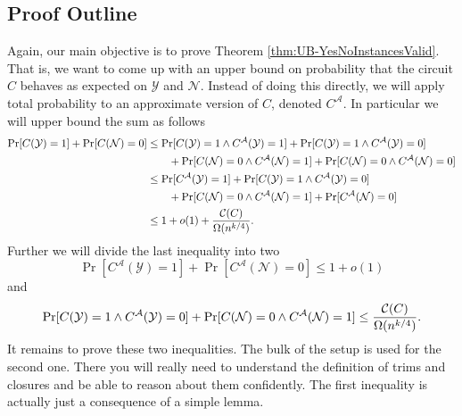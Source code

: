 \documentclass[11pt]{article}
\begin{document}
	\subsection{Proof Outline}
	Again, our main objective is to prove Theorem \ref{thm:UB-YesNoInstancesValid}. That is, we want to come up with an upper bound on probability that the circuit $C$ behaves as expected on $\mathcal{Y}$ and $\mathcal{N}$. Instead of doing this directly, we will apply total probability to an approximate version of $C$, denoted $C^{\mathcal{A}}$. In particular we will upper bound the sum as follows
	\begin{align*}
		\Pr[C(\mathcal{Y}) = 1] + \Pr[C(\mathcal{N}) = 0] &\leq \Pr[C(\mathcal{Y}) = 1 \land C^{\mathcal{A}}(\mathcal{Y}) = 1] + \Pr[C(\mathcal{Y}) = 1 \land C^{\mathcal{A}}(\mathcal{Y}) = 0] \\
		&\qquad + \Pr[C(\mathcal{N}) = 0 \land C^{\mathcal{A}}(\mathcal{N}) = 1] + \Pr[C(\mathcal{N}) = 0 \land C^{\mathcal{A}}(\mathcal{N}) = 0]\\
		&\leq \Pr[C^{\mathcal{A}}(\mathcal{Y}) = 1] + \Pr[C(\mathcal{Y}) = 1 \land C^{\mathcal{A}}(\mathcal{Y}) = 0] \\
		&\qquad+ \Pr[C(\mathcal{N}) = 0 \land C^{\mathcal{A}}(\mathcal{N}) = 1] + \Pr[C^{\mathcal{A}}(\mathcal{N}) = 0]\\
		&\leq 1 + o(1) + \frac{\mathcal{C}(C)}{\Omega(n^{k/4})}.
	\end{align*}
	Further we will divide the last inequality into two
	\[\Pr[C^{\mathcal{A}}(\mathcal{Y}) = 1] + \Pr[C^{\mathcal{A}}(\mathcal{N}) = 0] \leq 1 + o(1)\]
	and 
	\[\Pr[C(\mathcal{Y}) = 1 \land C^{\mathcal{A}}(\mathcal{Y}) = 0] + \Pr[C(\mathcal{N}) = 0 \land C^{\mathcal{A}}(\mathcal{N}) = 1] \leq \frac{\mathcal{C}(C)}{\Omega(n^{k/4})}.\]
	It remains to prove these two inequalities. The bulk of the setup is used for the second one. There you will really need to understand the definition of trims and closures and be able to reason about them confidently. The first inequality is actually just a consequence of a simple lemma. 
	  
\end{document}
